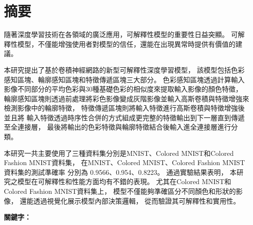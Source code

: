 \documentclass[class=NCU_thesis, crop=false]{standalone}
\begin{document}
\chapter{摘要}

隨著深度學習技術在各領域的廣泛應用，可解釋性模型的重要性日益突顯。
可解釋性模型，不僅能增強使用者對模型的信任，還能在出現異常時提供有價值的建議。

本研究提出了基於卷積神經網路的新型可解釋性深度學習模型，
該模型包括色彩感知區塊、輪廓感知區塊和特徵傳遞區塊三大部分。
色彩感知區塊透過計算輸入影像不同部分的平均色彩與30種基礎色彩的相似度來提取輸入影像的顏色特徵，
輪廓感知區塊則透過前處理將彩色影像變成灰階影像並輸入高斯卷積與特徵增強來檢測影像中的輪廓特徵，
特徵傳遞區塊則將輸入特徵進行高斯卷積與特徵增強後並且將
輸入特徵透過時序性合併的方式組成更完整的特徵輸出到下一層直到傳遞至全連接層，
最後將輸出的色彩特徵與輪廓特徵結合後輸入進全連接層進行分類。

本研究一共主要使用了三種資料集分別是MNIST、Colored MNIST和Colored Fashion MNIST資料集，
在MNIST、Colored MNIST、Colored Fashion MNIST資料集的測試準確率
分別為 0.9566、0.954、0.8223。
通過實驗結果表明，
本研究之模型在可解釋性和性能方面均有不錯的表現。
尤其在Colored MNIST和Colored Fashion MNIST資料集上，
模型不僅能夠準確區分不同顏色和形狀的影像，
還能透過視覺化展示模型內部決策邏輯，
從而驗證其可解釋性和實用性。

\vspace{2em}
\noindent \textbf{關鍵字：} \keywordsZh{} %
\end{document}
